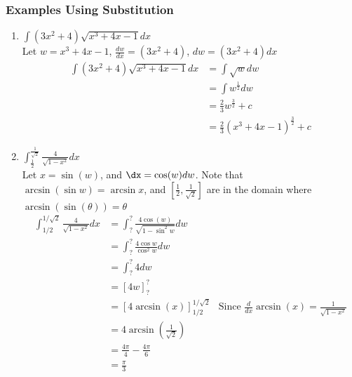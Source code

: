 \documentclass{article}
\begin{document}
\subsubsection{Examples Using Substitution}
\begin{enumerate}
    \item $\int (3x^2 + 4)\sqrt{x^3 + 4x - 1} dx$\\
    Let $w = x^3 + 4x - 1$, $\frac{dw}{dx} = (3x^2 + 4)$, $dw = (3x^2 + 4) dx$
    \begin{align*}
    \int (3x^2 + 4)\sqrt{x^3 + 4x - 1} dx & = \int \sqrt{w} dw\\
    & = \int w^{\frac{1}{2}} dw\\
    & = \frac{2}{3} w^{\frac{3}{2}} + c\\
    & = \frac{2}{3}(x^3 + 4x - 1)^{\frac{3}{2}} + c
    \end{align*}
    
    \item $\int_{\frac{1}{2}}^{\frac{1}{\sqrt{2}}} \frac{4}{\sqrt{1 - x^2}} dx$\\
    Let $x = \sin(w)$, and $\dx = \cos(w) dw$. Note that $\arcsin(\sin w) = \arcsin x$, and $[\frac{1}{2}, \frac{1}{\sqrt{2}}]$ are in the domain where $\arcsin(\sin(\theta)) = \theta$
    \begin{align*}
        \int_{1/2}^{1/\sqrt{2}}\frac{4}{\sqrt{1-x^2}}dx & = \int_?^? \frac{4 \cos(w)}{\sqrt{1-\sin^2w}}dw\\
        & = \int_?^? \frac{4\cos w}{\cos^2w}dw\\
        & = \int_?^? 4 dw\\
        & = [4w]_?^?\\
        & = [4 \arcsin(x)]_{1/2}^{1/\sqrt{2}} & \text{Since }\frac{d}{dx}\arcsin(x) = \frac{1}{\sqrt{1-x^2}}\\
        & = 4\arcsin(\frac{1}{\sqrt{2}})\\
        & = \frac{4\pi}{4} - \frac{4\pi}{6}\\
        & = \frac{\pi}{3}
    \end{align*}
\end{enumerate}
\end{document}
